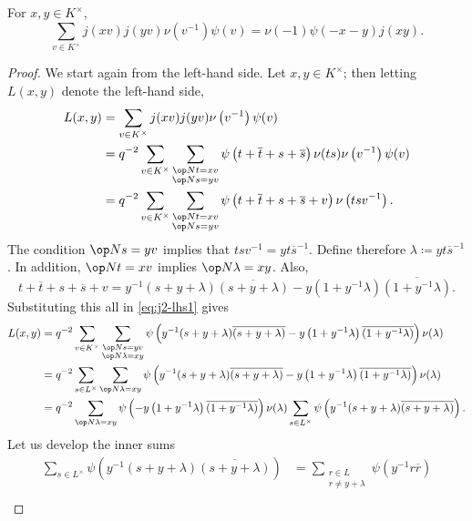 \documentclass[../main.tex]{subfiles}
\begin{document}
\begin{lemma} \label{lem:j2}
	For $x,y\in K^\times$,
	\[\sum_{v\in K^\times}j(xv)j(yv)\nu\left(v^{-1}\right)\psi(v)=\nu(-1)\psi(-x-y)j(xy).\]
\end{lemma}
\begin{proof}
	We start again from the left-hand side. Let $x,y\in K^\times$; then letting $L(x,y)$ denote the left-hand side,
	\begin{align}
		L(x,y) &= \sum_{v\in K^\times}j(xv)j(yv)\nu\left(v^{-1}\right)\psi(v) \notag \\
		 &= q^{-2}\sum_{v\in K^\times}\sum_{\substack{\op Nt=xv\\\op Ns=yv}}\psi\left(t+\overline t+s+\overline s\right)\nu(ts)\nu\left(v^{-1}\right)\psi(v) \notag \\
		&= q^{-2}\sum_{v\in K^\times}\sum_{\substack{\op Nt=xv\\\op Ns=yv}}\psi\left(t+\overline t+s+\overline s+v\right)\nu\left(tsv^{-1}\right). \label{eq:j2-lhs1}
	\end{align}
	The condition $\op Ns=yv$ implies that $tsv^{-1}=yt\overline s^{-1}$. Define therefore $\lambda\coloneqq yt\overline s^{-1}$. In addition, $\op Nt=xv$ implies $\op N\lambda=xy$. Also,
	\[t+\overline t+s+\overline s+v=y^{-1}(s+y+\lambda)\overline{(s+y+\lambda)}-y\left(1+y^{-1}\lambda\right)\overline{\left(1+y^{-1}\lambda\right)}.\]
	Substituting this all in \eqref{eq:j2-lhs1} gives
	\begin{align}
		L(x,y) &= q^{-2}\sum_{v\in K^\times}\sum_{\substack{\op Ns=yv\\\op N\lambda=xy}}\psi\left(y^{-1}(s+y+\lambda)\overline{(s+y+\lambda)}-y\left(1+y^{-1}\lambda\right)\overline{\left(1+y^{-1}\lambda\right)}\right)\nu(\lambda) \notag \\
		&= q^{-2}\sum_{s\in L^\times}\sum_{\op N\lambda=xy}\psi\left(y^{-1}(s+y+\lambda)\overline{(s+y+\lambda)}-y\left(1+y^{-1}\lambda\right)\overline{\left(1+y^{-1}\lambda\right)}\right)\nu(\lambda) \notag \\
		&= q^{-2}\sum_{\op N\lambda=xy}\psi\left(-y\left(1+y^{-1}\lambda\right)\overline{\left(1+y^{-1}\lambda\right)}\right)\nu(\lambda)\sum_{s\in L^\times}\psi\left(y^{-1}(s+y+\lambda)\overline{(s+y+\lambda)}\right). \label{eq:j2-lhs2}
	\end{align}
	Let us develop the inner sums
	\begin{align*}
		\sum_{s\in L^\times}\psi\left(y^{-1}(s+y+\lambda)\overline{(s+y+\lambda)}\right) &= \sum_{\substack{r\in L\\r\ne y+\lambda}}\psi\left(y^{-1}r\overline r\right) \\

\end{align*}
\end{proof}
\end{document}
